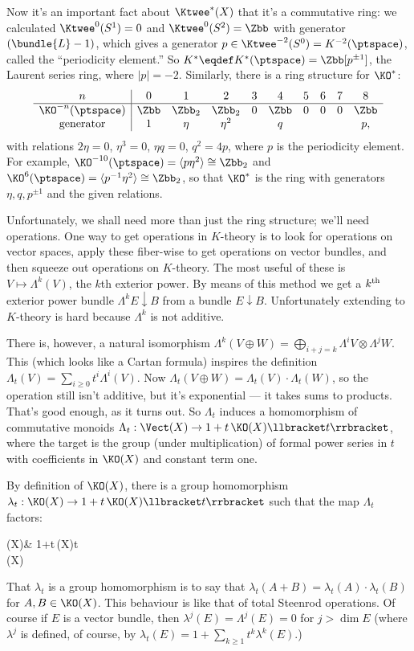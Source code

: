 Now it's an important fact about $\Ktwee^* (X)$ that it's a commutative ring: we calculated $\Ktwee^0 (S^1) = 0$ and $\Ktwee^0 (S^2) = \Zbb$ with generator $(\bundle{L} - 1)$, which gives a generator $p \in \Ktwee^{-2} (S^0) = K^{-2} (\ptspace)$, called the ``periodicity element.''  So $K^* \eqdef K^* (\ptspace) = \Zbb[p^{\pm 1}]$, the Laurent series ring, where $|p| = -2$.  Similarly, there is a ring structure for $\KO^*$:
\[
\begin{array}{c|ccccccccc}
n & 0 & 1 & 2 & 3 & 4 & 5 & 6 & 7 & 8 \\
\hline
\KO^{-n} (\ptspace) & \Zbb & \Zbb_2 & \Zbb_2 & 0 & \Zbb & 0 & 0 & 0 & \Zbb \\
\mathrm{generator} & 1 & \eta & \eta^2 & & q & & & & p,
\end{array}
\]
with relations $2\eta = 0$, $\eta^3 = 0$, $\eta q = 0$, $q^2 = 4p$, where $p$ is the periodicity element. For example, $\KO^{-10}(\ptspace) = \langle p\eta^2 \rangle \cong \Zbb_2$ and $\KO^{6}(\ptspace) = \langle p^{-1}\eta^2 \rangle \cong \Zbb_2$, so that $\KO^*$ is the ring with generators $\eta,q,p^{\pm1}$ and the given relations.

Unfortunately, we shall need more than just the ring structure; we'll need operations.  One way to get operations in $K$-theory is to look for operations on vector spaces, apply these fiber-wise to get operations on vector bundles, and then squeeze out operations on $K$-theory.  The most useful of these is $V \mapsto \Lambda^k(V)$, the $k$th exterior power.  By means of this method we get a $k^\textup{th}$ exterior power bundle $\Lambda^k E \downarrow B$ from a bundle $E\downarrow B$.  Unfortunately extending to $K$-theory is hard because $\Lambda^k$ is not additive.

There is, however, a natural isomorphism $\Lambda^k(V \oplus W) = \bigoplus_{i+j = k} \Lambda^i V \otimes \Lambda^j W$.  This (which looks like a Cartan formula) inspires the definition $\Lambda_t(V) = \sum_{i \ge 0} t^i \Lambda^i(V)$.  Now $\Lambda_t(V \oplus W) = \Lambda_t(V) \cdot \Lambda_t(W)$, so the operation still isn't additive, but it's exponential --- it takes sums to products.  That's good enough, as it turns out.  So $\Lambda_t$ induces a homomorphism of commutative monoids $\Lambda_t: \Vect(X) \to 1 + t\,\KO(X)\llbracket t \rrbracket$, where the target is the group (under multiplication) of formal power series in $t$ with coefficients in $\KO(X)$ and constant term one.

By definition of $\KO(X)$, there is a group homomorphism $\lambda_t: \KO(X) \to 1+t\,\KO(X) \llbracket t \rrbracket$ such that the map $\Lambda_t$ factors:
\begin{ctikzcd}
\Vect(X)\rar["\Lambda_t"]\dar & 1+t\,\KO(X)\llbracket t \rrbracket\\
\KO(X)\urar["\lambda_t"']
\end{ctikzcd}
That $\lambda_t$ is a group homomorphism is to say that
$\lambda_t(A + B) = \lambda_t(A) \cdot \lambda_t(B)$
for $A, B \in \KO(X)$. This behaviour is like that of total Steenrod operations.  Of course if $E$ is a vector bundle, then $\lambda^j(E) = \Lambda^j(E) = 0$ for $j > \dim E$ (where $\lambda^j$ is defined, of course, by $\lambda_t(E) = 1 + \sum_{k \ge 1} t^k \lambda^k(E)$.)

